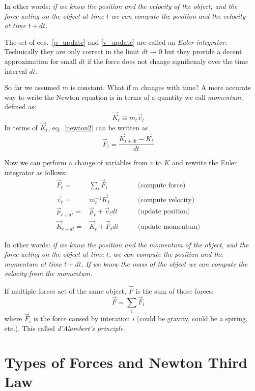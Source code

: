 \documentclass[12pt]{article}
\begin{document}
In other words: {\it if we know the position and the velocity of the object, and the force acting on the object at time $t$ we can compute the position and the velocity at time $t+dt$.}

The set of eqs.~\ref{p_update} and \ref{v_update} are called an {\it Euler integrator}. Technically they are only correct in the limit $dt\rightarrow 0$ but they provide a decent approximation for small $dt$ if the force does not change significnaly over the time interval $dt$.

So far we assumed $m$ is constant. What if $m$ changes with time? A more accurate way to write the Newton equation is in terms of a quantity we call {\it momentum}, defined as:
\begin{equation}
\vec K_t \equiv m_t \vec v_t 
\end{equation}
In terms of $\vec K_t$, eq.~\ref{newton2} can be written as
\begin{equation}
\vec F_t = \frac{\vec K_{t+dt}-\vec K_t}{dt} 
\label{newton21}
\end{equation}

Now we can perform a change of variables from $v$ to $K$ and rewrite the Euler integrator as follows:
\begin{eqnarray}
\vec F_t =& \sum_i \vec F_i &\qquad \textrm{(compute force)}\\
\vec v_{t} =& m_t^{-1}\vec K_{t} &\qquad \textrm{(compute velocity)}\\
\vec p_{t+dt} =& \vec p_t + \vec v_t dt &\qquad \textrm{(update position)}\\
\vec K_{t+dt} =& \vec K_t + \vec F_t dt &\qquad \textrm{(update momentum)}\label{euler21}
\end{eqnarray}

In other words: {\it if we know the position and the momentum of the object, and the force acting on the object at time $t$, we can compute the position and the momentum at time $t+dt$. If we know the mass of the object we can compute the velocity from the momentum.}

If multiple forces act of the same object, $\vec F$ is the sum of those forces:
\begin{equation}
\vec F = \sum_i \vec F_i
\end{equation}
where $\vec F_i$ is the force caused by interation $i$ (could be gravity, could be a spiring, etc.). This called {\it d'Alambert's principle}.

\section{Types of Forces and Newton Third Law}
\end{document}
